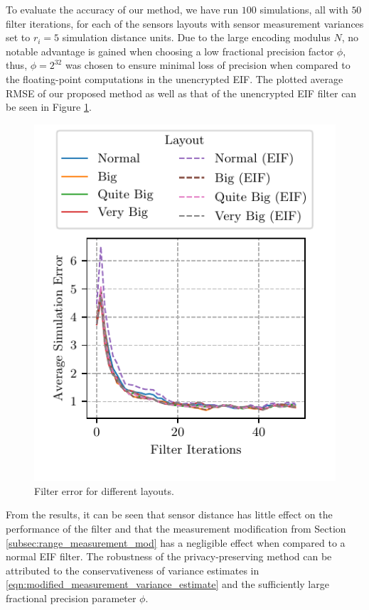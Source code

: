\documentclass[10pt,letterpaper,oneside,twocolumn,journal]{IEEEtran}
\theoremstyle{definition}
\theoremstyle{definition}
\theoremstyle{remark}
\begin{document}
To evaluate the accuracy of our method, we have run $100$ simulations, all with $50$ filter iterations, for each of the sensors layouts with sensor measurement variances set to $r_i=5$ simulation distance units. Due to the large encoding modulus $N$, no notable advantage is gained when choosing a low fractional precision factor $\phi$, thus, $\phi=2^{32}$ was chosen to ensure minimal loss of precision when compared to the floating-point computations in the unencrypted EIF. The plotted average RMSE of our proposed method as well as that of the unencrypted EIF filter can be seen in Figure \ref{fig:sim_layout_errors}.
\begin{figure}[htbp]
\centering
\includegraphics{images/layout_errors.pdf}
\caption{Filter error for different layouts.}
\label{fig:sim_layout_errors}
\end{figure}
From the results, it can be seen that sensor distance has little effect on the performance of the filter and that the measurement modification from Section \ref{subsec:range_measurement_mod} has a negligible effect when compared to a normal EIF filter. The robustness of the privacy-preserving method can be attributed to the conservativeness of variance estimates in \eqref{eqn:modified_measurement_variance_estimate} and the sufficiently large fractional precision parameter $\phi$.
\end{document}
